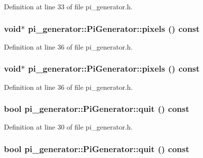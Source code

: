 Definition at line 33 of file pi\_\-generator.h.

\hypertarget{classpi__generator_1_1_pi_generator_a3e4279bb7732861b21ab6d1dcfc27429}{
\subsubsection[{pixels}]{\setlength{\rightskip}{0pt plus 5cm}void$\ast$ pi\_\-generator::PiGenerator::pixels () const}}
\label{classpi__generator_1_1_pi_generator_a3e4279bb7732861b21ab6d1dcfc27429}


Definition at line 36 of file pi\_\-generator.h.

\hypertarget{classpi__generator_1_1_pi_generator_a3e4279bb7732861b21ab6d1dcfc27429}{
\subsubsection[{pixels}]{\setlength{\rightskip}{0pt plus 5cm}void$\ast$ pi\_\-generator::PiGenerator::pixels () const}}
\label{classpi__generator_1_1_pi_generator_a3e4279bb7732861b21ab6d1dcfc27429}


Definition at line 36 of file pi\_\-generator.h.

\hypertarget{classpi__generator_1_1_pi_generator_a02e8796485d878cbe8a42dcc2b204c4a}{
\subsubsection[{quit}]{\setlength{\rightskip}{0pt plus 5cm}bool pi\_\-generator::PiGenerator::quit () const}}
\label{classpi__generator_1_1_pi_generator_a02e8796485d878cbe8a42dcc2b204c4a}


Definition at line 30 of file pi\_\-generator.h.

\hypertarget{classpi__generator_1_1_pi_generator_a02e8796485d878cbe8a42dcc2b204c4a}{
\subsubsection[{quit}]{\setlength{\rightskip}{0pt plus 5cm}bool pi\_\-generator::PiGenerator::quit () const}}
\label{classpi__generator_1_1_pi_generator_a02e8796485d878cbe8a42dcc2b204c4a}


